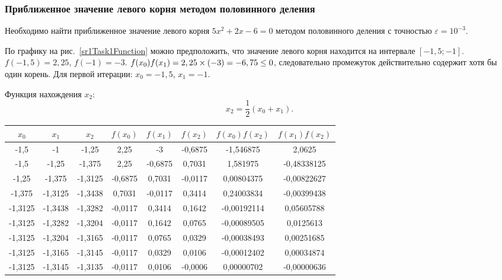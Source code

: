 \documentclass[10pt, a4paper, titlepage]{article}
\newcommand*{\hm}[1]{#1\nobreak\discretionary{}{\hbox{$\mathsurround=0pt #1$}}{}} %
\begin{document}
\subsubsection*{Приближенное значение левого корня методом половинного деления}
Необходимо найти приближенное значение левого корня $5x^2+2x-6=0$ методом половинного деления с точностью $\varepsilon=10^{-3}$.

По графику на рис.~\ref{sr1Task1Function} можно предположить, что значение левого корня находится на интервале $[-1,5;-1]$. $f(-1,5)=2,25$, $f(-1)=-3$. $f(x_0)f(x_1) \hm =2,25\times(-3)=-6,75\leq0$, следовательно промежуток действительно содержит хотя бы один корень. Для первой итерации: $x_0=-1,5$, $x_1=-1$.

Функция нахождения $x_2$:
$$x_2=\frac{1}{2}(x_0+x_1).$$

\begin{center}
    \begin{tabular}{|c|c|c|c|c|c|c|c|}
        \hline
        $x_0$ & $x_1$ & $x_2$ & $f(x_0)$ & $f(x_1)$ & $f(x_2)$ & $f(x_0)f(x_2)$ & $f(x_1)f(x_2)$ \\ \hline
        
        -1,5 & -1 & -1,25 &	2,25 & -3 & -0,6875 & -1,546875 & 2,0625 \\ \hline
        
        -1,5 & -1,25 & -1,375 & 2,25 &	-0,6875	& 0,7031 & 1,581975 & -0,48338125 \\ \hline
        
        -1,25 & -1,375 & -1,3125 & -0,6875 & 0,7031 & -0,0117 & 0,00804375 & -0,00822627 \\ \hline
        
        -1,375 & -1,3125 & -1,3438 & 0,7031 & -0,0117 &	0,3414 & 0,24003834 & -0,00399438 \\ \hline
        
        -1,3125 & -1,3438 & -1,3282 & -0,0117 & 0,3414 & 0,1642 & -0,00192114 &	0,05605788 \\ \hline
        
        -1,3125 & -1,3282 & -1,3204 & -0,0117 & 0,1642 & 0,0765 & -0,00089505 & 0,0125613 \\ \hline
        
        -1,3125 & -1,3204 & -1,3165 & -0,0117 & 0,0765 & 0,0329 & -0,00038493 & 0,00251685 \\ \hline
        
        -1,3125 & -1,3165 & -1,3145 & -0,0117 & 0,0329 & 0,0106 & -0,00012402 & 0,00034874 \\ \hline
        
        -1,3125 & -1,3145 & -1,3135 & -0,0117 & 0,0106 & -0,0006 & 0,00000702 & -0,00000636 \\ \hline
        
    \end{tabular}
\end{center}
\end{document}
